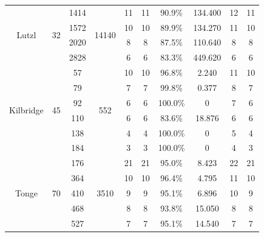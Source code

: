 \begin{table}[h!]
{\begin{tabular}{c|c|c|c|c|c|c|c|c|c}
		\hline
		\multirow{4}{*}{Lutzl} & \multirow{4}{*}{32} & 1414 & \multirow{4}{*}{14140} & 11 & 11 & 90.9\% & 134.400 & 12 & 11\\
		\cline{3-3}
		\cline{5-10}
		& & 1572 & & 10& 10& 89.9\% & 134.270 &11 & 10\\
		\cline{3-3}
		\cline{5-10}
		& & 2020 & & 8& 8& 87.5\% & 110.640 &8 & 8\\
		\cline{3-3}
		\cline{5-10}
		& & 2828 & & 6& 6& 83.3\% & 449.620 &6 & 6\\
		\hline
		\multirow{6}{*}{Kilbridge} & \multirow{6}{*}{45} & 57 & \multirow{6}{*}{552} & 10 & 10 & 96.8\% & 2.240 & 11 & 10\\
		\cline{3-3}
		\cline{5-10}
		& & 79 & & 7& 7& 99.8\% & 0.377 &8 & 7\\
		\cline{3-3}
		\cline{5-10}
		& & 92 & & 6& 6& 100.0\% & 0 &7 & 6\\
		\cline{3-3}
		\cline{5-10}
		& & 110 & & 6& 6& 83.6\% & 18.876 &6 & 6\\
		\cline{3-3}
		\cline{5-10}
		& & 138 & & 4& 4& 100.0\% & 0 &5 & 4\\
		\cline{3-3}
		\cline{5-10}
		& & 184 & & 3& 3& 100.0\% & 0 &4 & 3\\
		\hline
		\multirow{5}{*}{Tonge} & \multirow{5}{*}{70} & 176 & \multirow{5}{*}{3510} & 21 & 21 & 95.0\% & 8.423 & 22 & 21\\
		\cline{3-3}
		\cline{5-10}
		& & 364 & & 10& 10& 96.4\% & 4.795 &11 & 10\\
		\cline{3-3}
		\cline{5-10}
		& & 410 & & 9& 9& 95.1\% & 6.896 &10 & 9\\
		\cline{3-3}
		\cline{5-10}
		& & 468 & & 8& 8& 93.8\% & 15.050 &8 & 8\\
		\cline{3-3}
		\cline{5-10}
		& & 527 & & 7& 7& 95.1\% & 14.540 &7 & 7\\
		\hline
	\end{tabular}}
	
\end{table}